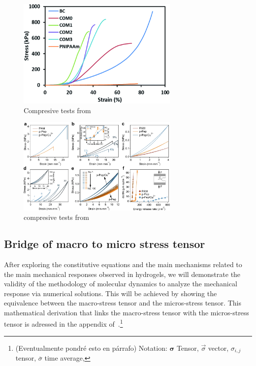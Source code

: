 \begin{figure}[ht!]
    \centering
    \includegraphics[width=0.7\textwidth]{figs/mechResponse/7.png}
    \caption{Compresive tests from\citep{wangRapidUniaxialActuation2018}}
\end{figure}

\begin{figure}[ht!]
    \centering
    \includegraphics[width=0.7\textwidth]{figs/mechResponse/8.png}
    \caption{compresive tests from\citep{xuestrongtoughrapidrecovery2023}}
\end{figure}




\subsection{Bridge of macro to micro stress tensor}

After exploring the constitutive equations and the main mechanisms related to the main mechanical responses observed in hydrogels, we will demonstrate the validity of the methodology of molecular dynamics to analyze the mechanical response via numerical solutions. 
This will be achieved by showing the equivalence between the macro-stress tensor and the micros-stress tensor.
This mathematical derivation that links the macro-stress tensor with the micros-stress tensor is adressed in the appendix of~\citep{admalUnifiedInterpretationStress2010}.\footnote{(Eventualmente pondré esto en párrafo) Notation:
    $\bm{\sigma}$ Tensor, $\vec{\sigma}$ vector, $\sigma_{i,j}$ tensor, $\overline{\sigma}$ time average, 
}

